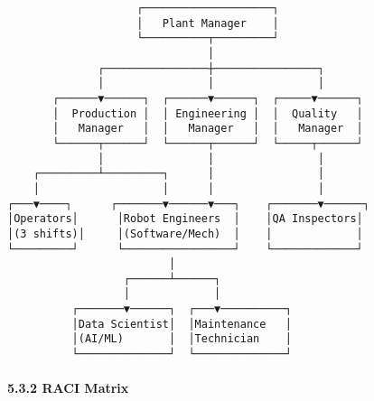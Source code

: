 \documentclass[
]{article}
\begin{document}
\begin{verbatim}
                    ┌────────────────────┐
                    │   Plant Manager    │
                    └──────────┬─────────┘
                               │
              ┌────────────────┼────────────────┐
              │                │                │
       ┌──────▼──────┐  ┌──────▼──────┐  ┌─────▼──────┐
       │  Production │  │ Engineering │  │  Quality   │
       │   Manager   │  │   Manager   │  │   Manager  │
       └──────┬──────┘  └──────┬──────┘  └─────┬──────┘
              │                │                │
    ┌─────────┴─────────┐      │                │
    │                   │      │                │
┌───▼────┐      ┌───────▼──────▼───┐    ┌───────▼──────┐
│Operators│      │Robot Engineers  │    │QA Inspectors│
│(3 shifts)│     │(Software/Mech)  │    │             │
└─────────┘      └─────────────────┘    └─────────────┘
                         │
                  ┌──────┴──────┐
                  │             │
          ┌───────▼──────┐  ┌───▼──────────┐
          │Data Scientist│  │Maintenance   │
          │(AI/ML)       │  │Technician    │
          └──────────────┘  └──────────────┘
\end{verbatim}

\hypertarget{raci-matrix}{%
\paragraph{5.3.2 RACI Matrix}\label{raci-matrix}}
\end{document}
